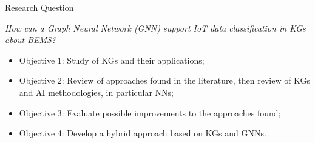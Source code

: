 \begin{frame}{Research Question}
    \begin{center}
        \textit{How can a Graph Neural Network (GNN) support IoT data classification in KGs about BEMS?}
    \end{center}
    \begin{itemize}
        \item Objective 1: Study of KGs and their applications;
        \item Objective 2: Review of approaches found in the literature, then review of KGs and AI methodologies, in
        particular NNs;
        \item Objective 3: Evaluate possible improvements to the approaches found;
        \item Objective 4: Develop a hybrid approach based on KGs and GNNs.
    \end{itemize}
\end{frame}